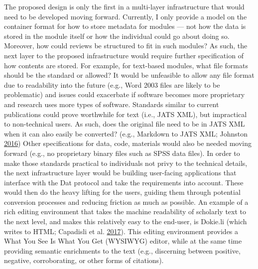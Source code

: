 \documentclass[a5paper]{book}
\begin{document}
The proposed design is only the first in a multi-layer infrastructure
that would need to be developed moving forward. Currently, I only
provide a model on the container format for how to store metadata for
modules --- not how the data is stored in the module itself or how the
individual could go about doing so. Moreover, how could reviews be
structured to fit in such modules? As such, the next layer to the
proposed infrastructure would require further specification of how
contents are stored. For example, for text-based modules, what file
formats should be the standard or allowed? It would be unfeasible to
allow any file format due to readability into the future (e.g., Word
2003 files are likely to be problematic) and issues could exacerbate if
software becomes more proprietary and research uses more types of
software. Standards similar to current publications could prove
worthwhile for text (i.e., JATS XML), but impractical to non-technical
users. As such, does the original file need to be in JATS XML when it
can also easily be converted? (e.g., Markdown to JATS XML; Johnston
\protect\hyperlink{ref-jatdown}{2016}) Other specifications for data,
code, materials would also be needed moving forward (e.g., no
proprietary binary files such as SPSS data files). In order to make
those standards practical to individuals not privy to the technical
details, the next infrastructure layer would be building user-facing
applications that interface with the Dat protocol and take the
requirements into account. These would then do the heavy lifting for the
users, guiding them through potential conversion processes and reducing
friction as much as possible. An example of a rich editing environment
that takes the machine readability of scholarly text to the next level,
and makes this relatively easy to the end-user, is Dokie.li (which
writes to HTML; Capadisli et al. \protect\hyperlink{ref-dokieli}{2017}).
This editing environment provides a What You See Is What You Get
(WYSIWYG) editor, while at the same time providing semantic enrichments
to the text (e.g., discerning between positive, negative, corroborating,
or other forms of citations).
\end{document}
